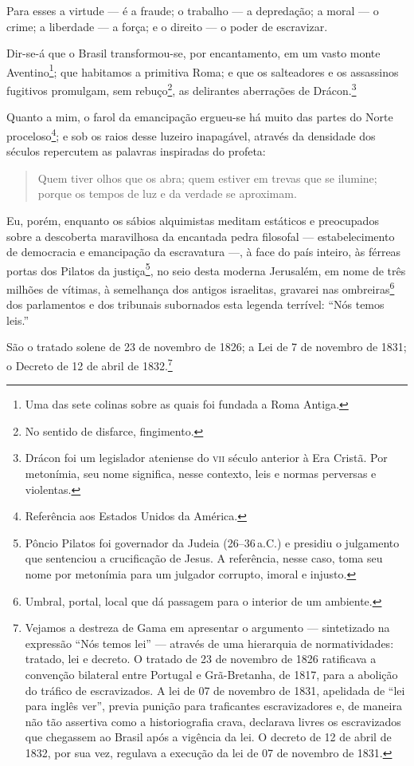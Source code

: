 Para esses a virtude --- é a fraude; o trabalho --- a depredação; a moral
--- o crime; a liberdade --- a força; e o direito --- o poder de
escravizar.

Dir-se-á que o Brasil transformou-se, por encantamento, em um vasto
monte Aventino\footnote{Uma das sete colinas sobre as quais foi
  fundada a Roma Antiga.}; que habitamos a primitiva Roma; e que os
salteadores e os assassinos fugitivos promulgam, sem rebuço\footnote{
  No sentido de disfarce, fingimento.}, as delirantes aberrações de
Drácon.\footnote{Drácon foi um legislador ateniense do \textsc{vii} século
  anterior à Era Cristã. Por metonímia, seu nome significa, nesse
  contexto, leis e normas perversas e violentas.}

Quanto a mim, o farol da emancipação ergueu-se há muito das partes do
Norte proceloso\footnote{Referência aos Estados Unidos da América.}; e
sob os raios desse luzeiro inapagável, através da densidade dos séculos
repercutem as palavras inspiradas do profeta:

\begin{quote}
Quem tiver olhos que os abra; quem estiver em trevas que se ilumine;
porque os tempos de luz e da verdade se aproximam.
\end{quote}

Eu, porém, enquanto os sábios alquimistas meditam estáticos e
preocupados sobre a descoberta maravilhosa da encantada pedra filosofal
--- estabelecimento de democracia e emancipação da escravatura ---, à face
do país inteiro, às férreas portas dos Pilatos da justiça\footnote{
  Pôncio Pilatos foi governador da Judeia (26--36\,a.C.) e presidiu o
  julgamento que sentenciou a crucificação de Jesus. A referência, nesse
  caso, toma seu nome por metonímia para um julgador corrupto, imoral e
  injusto.}, no seio desta moderna Jerusalém, em nome de três milhões de
vítimas, à semelhança dos antigos israelitas, gravarei nas
ombreiras\footnote{Umbral, portal, local que dá passagem para o
  interior de um ambiente.} dos parlamentos e dos tribunais subornados
esta legenda terrível: ``Nós temos leis.''

São o tratado solene de 23 de novembro de 1826; a Lei de 7 de novembro
de 1831; o Decreto de 12 de abril de 1832.\footnote{Vejamos a destreza
  de Gama em apresentar o argumento --- sintetizado na expressão ``Nós
  temos lei'' --- através de uma hierarquia de normatividades: tratado,
  lei e decreto. O tratado de 23 de novembro de 1826 ratificava a convenção
  bilateral entre Portugal e Grã-Bretanha, de 1817, para a abolição do
  tráfico de escravizados. A lei de 07 de novembro de 1831, apelidada de ``lei para
  inglês ver'', previa punição para traficantes escravizadores e, de
  maneira não tão assertiva como a historiografia crava, declarava
  livres os escravizados que chegassem ao Brasil após a vigência da lei.
  O decreto de 12 de abril de 1832, por sua vez, regulava a execução da lei de
  07 de novembro de 1831.}

